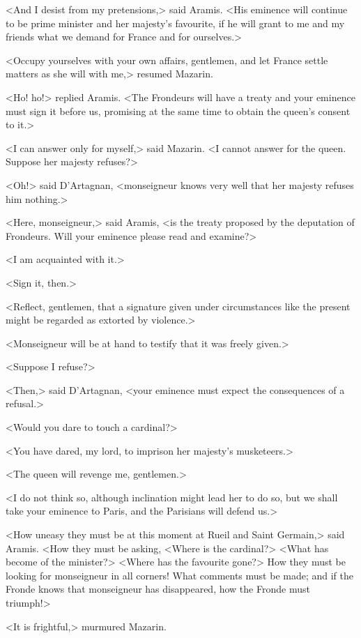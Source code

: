 <And I desist from my pretensions,> said Aramis. <His eminence will continue to be prime minister and her majesty's favourite, if he will grant to me and my friends what we demand for France and for ourselves.>

<Occupy yourselves with your own affairs, gentlemen, and let France settle matters as she will with me,> resumed Mazarin.

<Ho! ho!> replied Aramis. <The Frondeurs will have a treaty and your eminence must sign it before us, promising at the same time to obtain the queen's consent to it.>

<I can answer only for myself,> said Mazarin. <I cannot answer for the queen. Suppose her majesty refuses?>

<Oh!> said D'Artagnan, <monseigneur knows very well that her majesty refuses him nothing.>

<Here, monseigneur,> said Aramis, <is the treaty proposed by the deputation of Frondeurs. Will your eminence please read and examine?>

<I am acquainted with it.>

<Sign it, then.>

<Reflect, gentlemen, that a signature given under circumstances like the present might be regarded as extorted by violence.>

<Monseigneur will be at hand to testify that it was freely given.>

<Suppose I refuse?>

<Then,> said D'Artagnan, <your eminence must expect the consequences of a refusal.>

<Would you dare to touch a cardinal?>

<You have dared, my lord, to imprison her majesty's musketeers.>

<The queen will revenge me, gentlemen.>

<I do not think so, although inclination might lead her to do so, but we shall take your eminence to Paris, and the Parisians will defend us.>

<How uneasy they must be at this moment at Rueil and Saint Germain,> said Aramis. <How they must be asking, <Where is the cardinal?> <What has become of the minister?> <Where has the favourite gone?> How they must be looking for monseigneur in all corners! What comments must be made; and if the Fronde knows that monseigneur has disappeared, how the Fronde must triumph!>

<It is frightful,> murmured Mazarin.

